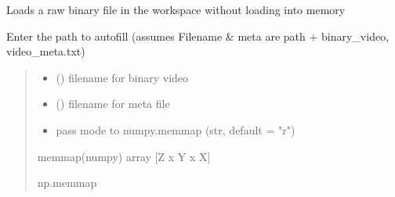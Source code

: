 \documentclass[letterpaper,10pt,english]{sphinxmanual}
\begin{document}

\begin{fulllineitems}
\label{\detokenize{CalSciPy.io:CalSciPy.io.load_mapped_binary}}
\pysigstartsignatures
{}
\pysigstopsignatures
\sphinxAtStartPar
Loads a raw binary file in the workspace without loading into memory

\sphinxAtStartPar
Enter the path to autofill (assumes Filename \& meta are path + binary\_video, video\_meta.txt)
\begin{quote}\begin{description}
\begin{itemize}
\item {} 
\sphinxAtStartPar
{} () \sphinxhyphen{}\sphinxhyphen{} filename for binary video

\item {} 
\sphinxAtStartPar
{} () \sphinxhyphen{}\sphinxhyphen{} filename for meta file

\item {} 
\sphinxAtStartPar
{} \sphinxhyphen{}\sphinxhyphen{} pass mode to numpy.memmap (str, default = "r")

\end{itemize}

\sphinxAtStartPar
memmap(numpy) array {[}Z x Y x X{]}

\sphinxAtStartPar
np.memmap

\end{description}\end{quote}

\end{fulllineitems}

\end{document}
